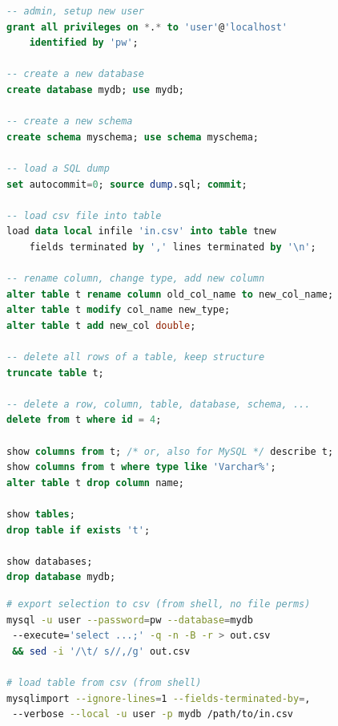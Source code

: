\begin{lstlisting}[language=SQL]
-- admin, setup new user
grant all privileges on *.* to 'user'@'localhost'
	identified by 'pw';

-- create a new database
create database mydb; use mydb;

-- create a new schema
create schema myschema; use schema myschema;

-- load a SQL dump
set autocommit=0; source dump.sql; commit;

-- load csv file into table
load data local infile 'in.csv' into table tnew
	fields terminated by ',' lines terminated by '\n';

-- rename column, change type, add new column
alter table t rename column old_col_name to new_col_name;
alter table t modify col_name new_type;
alter table t add new_col double;

-- delete all rows of a table, keep structure
truncate table t;

-- delete a row, column, table, database, schema, ...
delete from t where id = 4;

show columns from t; /* or, also for MySQL */ describe t;
show columns from t where type like 'Varchar%';
alter table t drop column name;

show tables;
drop table if exists 't';

show databases;
drop database mydb;
\end{lstlisting}

\begin{lstlisting}[language=bash]
# export selection to csv (from shell, no file perms)
mysql -u user --password=pw --database=mydb
 --execute='select ...;' -q -n -B -r > out.csv
 && sed -i '/\t/ s//,/g' out.csv

# load table from csv (from shell)
mysqlimport --ignore-lines=1 --fields-terminated-by=,
 --verbose --local -u user -p mydb /path/to/in.csv
\end{lstlisting}
